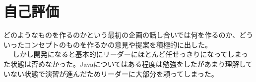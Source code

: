 \documentclass[a4j]{jarticle}
\begin{document}
\section{自己評価}
% 
% 

どのようなものを作るのかという最初の企画の話し合いでは何を作るのか、どういったコンセプトのものを作るかの意見や提案を積極的に出した。\\　
しかし開発になると基本的にリーダーにほとんど任せっきりになってしまった状態は否めなかった。Javaについてはある程度は勉強をしたがあまり理解していない状態で演習が進んだためリーダーに大部分を頼ってしまった。


\end{document}
